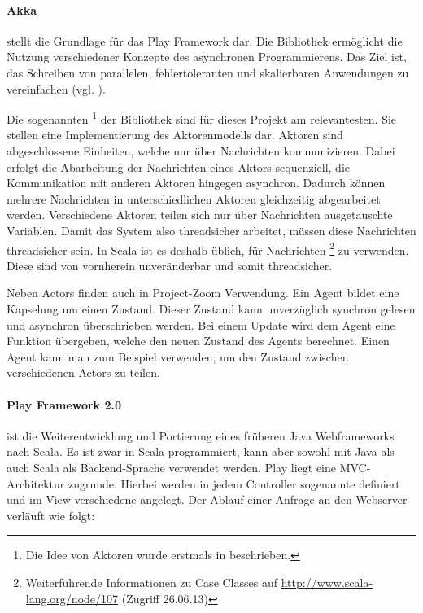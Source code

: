 \paragraph{Akka}\label{sec:actor} stellt die Grundlage für das Play Framework dar. Die Bibliothek ermöglicht die Nutzung verschiedener Konzepte des asynchronen Programmierens. Das Ziel ist, das Schreiben von parallelen, fehlertoleranten und skalierbaren Anwendungen zu vereinfachen (vgl. \cite{what-is-akka}). 

Die sogenannten \footnote{Die Idee von Aktoren wurde erstmals in \cite{actors} beschrieben.} der Bibliothek sind für dieses Projekt am relevantesten. Sie stellen eine Implementierung des Aktorenmodells dar. Aktoren sind abgeschlossene Einheiten, welche nur über Nachrichten kommunizieren. Dabei erfolgt die Abarbeitung der Nachrichten eines Aktors sequenziell, die Kommunikation mit anderen Aktoren hingegen asynchron. Dadurch können mehrere Nachrichten in unterschiedlichen Aktoren gleichzeitig abgearbeitet werden. Verschiedene Aktoren teilen sich nur über Nachrichten ausgetauschte Variablen. Damit das System also threadsicher arbeitet, müssen diese Nachrichten threadsicher sein. In Scala ist es deshalb üblich, für Nachrichten \footnote{Weiterführende Informationen zu Case Classes auf \url{ http://www.scala-lang.org/node/107} (Zugriff 26.06.13)} zu verwenden. Diese sind von vornherein unveränderbar und somit threadsicher.

Neben Actors finden auch  in Project-Zoom Verwendung. Ein Agent bildet eine Kapselung um einen Zustand. Dieser Zustand kann unverzüglich synchron gelesen und asynchron überschrieben werden. Bei einem Update wird dem Agent eine Funktion übergeben, welche den neuen Zustand des Agents berechnet. Einen Agent kann man zum Beispiel verwenden, um den Zustand zwischen verschiedenen Actors zu teilen.

\paragraph{Play Framework 2.0} ist die Weiterentwicklung und Portierung eines früheren Java Webframeworks nach Scala. Es ist zwar in Scala programmiert, kann aber sowohl mit Java als auch Scala als Backend-Sprache verwendet werden. Play liegt eine MVC-Architektur zugrunde. Hierbei werden in jedem Controller sogenannte  definiert und im View verschiedene  angelegt. Der Ablauf einer Anfrage an den Webserver verläuft wie folgt:

